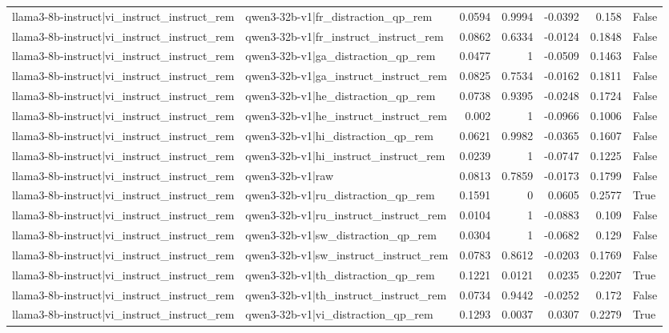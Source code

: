 \begin{table}
\begin{tabular}{l l r r r r l}
llama3-8b-instruct|vi_instruct_instruct_rem & qwen3-32b-v1|fr_distraction_qp_rem & 0.0594 & 0.9994 & -0.0392 & 0.158 & False \\
llama3-8b-instruct|vi_instruct_instruct_rem & qwen3-32b-v1|fr_instruct_instruct_rem & 0.0862 & 0.6334 & -0.0124 & 0.1848 & False \\
llama3-8b-instruct|vi_instruct_instruct_rem & qwen3-32b-v1|ga_distraction_qp_rem & 0.0477 & 1 & -0.0509 & 0.1463 & False \\
llama3-8b-instruct|vi_instruct_instruct_rem & qwen3-32b-v1|ga_instruct_instruct_rem & 0.0825 & 0.7534 & -0.0162 & 0.1811 & False \\
llama3-8b-instruct|vi_instruct_instruct_rem & qwen3-32b-v1|he_distraction_qp_rem & 0.0738 & 0.9395 & -0.0248 & 0.1724 & False \\
llama3-8b-instruct|vi_instruct_instruct_rem & qwen3-32b-v1|he_instruct_instruct_rem & 0.002 & 1 & -0.0966 & 0.1006 & False \\
llama3-8b-instruct|vi_instruct_instruct_rem & qwen3-32b-v1|hi_distraction_qp_rem & 0.0621 & 0.9982 & -0.0365 & 0.1607 & False \\
llama3-8b-instruct|vi_instruct_instruct_rem & qwen3-32b-v1|hi_instruct_instruct_rem & 0.0239 & 1 & -0.0747 & 0.1225 & False \\
llama3-8b-instruct|vi_instruct_instruct_rem & qwen3-32b-v1|raw & 0.0813 & 0.7859 & -0.0173 & 0.1799 & False \\
llama3-8b-instruct|vi_instruct_instruct_rem & qwen3-32b-v1|ru_distraction_qp_rem & 0.1591 & 0 & 0.0605 & 0.2577 & True \\
llama3-8b-instruct|vi_instruct_instruct_rem & qwen3-32b-v1|ru_instruct_instruct_rem & 0.0104 & 1 & -0.0883 & 0.109 & False \\
llama3-8b-instruct|vi_instruct_instruct_rem & qwen3-32b-v1|sw_distraction_qp_rem & 0.0304 & 1 & -0.0682 & 0.129 & False \\
llama3-8b-instruct|vi_instruct_instruct_rem & qwen3-32b-v1|sw_instruct_instruct_rem & 0.0783 & 0.8612 & -0.0203 & 0.1769 & False \\
llama3-8b-instruct|vi_instruct_instruct_rem & qwen3-32b-v1|th_distraction_qp_rem & 0.1221 & 0.0121 & 0.0235 & 0.2207 & True \\
llama3-8b-instruct|vi_instruct_instruct_rem & qwen3-32b-v1|th_instruct_instruct_rem & 0.0734 & 0.9442 & -0.0252 & 0.172 & False \\
llama3-8b-instruct|vi_instruct_instruct_rem & qwen3-32b-v1|vi_distraction_qp_rem & 0.1293 & 0.0037 & 0.0307 & 0.2279 & True \\

\end{tabular}
\end{table}
